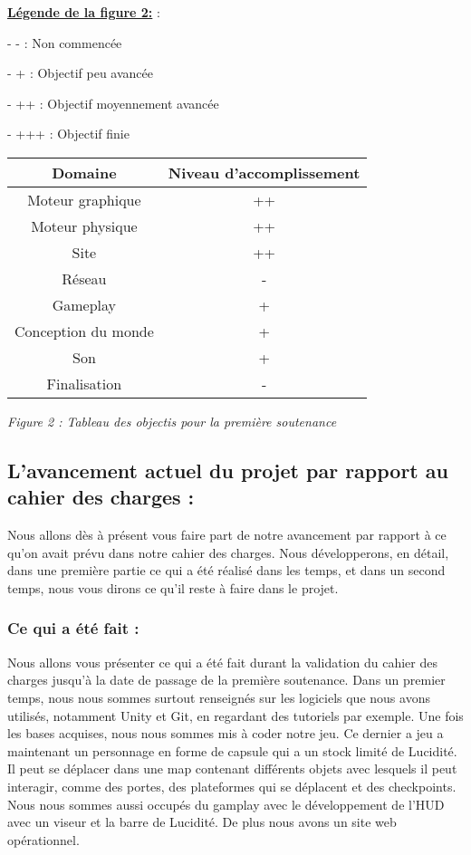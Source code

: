 \documentclass[a4paper]{article}
\begin{document}
\quad

\underline{\textbf{Légende de la figure 2:}} : 

\quad
	   -  -     : Non commencée

 \quad
	- +     : Objectif peu avancée

 \quad
	- ++   : Objectif moyennement avancée

 \quad
	- +++ : Objectif finie 

\quad

\begin{tabular}{|c|c|}
\hline Domaine & Niveau d'accomplissement \\
\hline Moteur graphique & ++ \\
\hline Moteur physique & ++ \\
\hline Site & ++\\
\hline Réseau & -\\
\hline Gameplay & +\\
\hline Conception du monde & + \\
\hline Son & + \\
\hline Finalisation & - \\
\hline
\end {tabular}


\begin{center}

\textit{Figure 2 : Tableau des objectis pour la première soutenance}

\end{center}

\quad

	\subsection{L’avancement actuel du projet par rapport au cahier des charges :}

\quad
        Nous allons dès à présent vous faire part de notre avancement par rapport à ce qu’on avait prévu dans notre cahier des charges.
Nous développerons, en détail, dans une première partie ce qui a été réalisé dans les temps, et dans un second temps, nous vous dirons ce qu’il reste à faire dans le projet.
\quad
		\subsubsection{Ce qui a été fait :}

\quad

Nous allons vous présenter ce qui a été fait durant la validation du cahier des charges jusqu’à la date de passage de la première soutenance.
Dans un premier temps, nous nous sommes surtout renseignés sur les logiciels que nous avons utilisés, notamment Unity et Git, en regardant des tutoriels par exemple. Une fois les bases acquises, nous nous sommes mis à coder notre jeu. Ce dernier a jeu a maintenant un personnage en forme de capsule qui a un stock limité de Lucidité. Il peut se déplacer dans une map contenant différents objets avec lesquels il peut interagir, comme des portes, des plateformes qui se déplacent et des checkpoints. Nous nous sommes aussi occupés du gamplay avec le développement de l’HUD avec un viseur et la barre de Lucidité. De plus nous avons un site web opérationnel.
\end{document}
